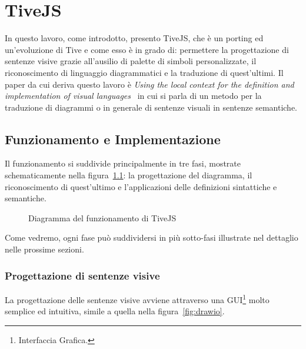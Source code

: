 ﻿\chapter{TiveJS}
    In questo lavoro, come introdotto, presento TiveJS, che è un porting ed un'evoluzione di Tive e come esso è in grado di: permettere la progettazione di sentenze visive grazie all'ausilio di palette di simboli personalizzate, il riconoscimento di linguaggio diagrammatici e la traduzione di quest'ultimi.
    \newline
    Il paper da cui deriva questo lavoro è \textit{Using the local context for the definition and implementation of visual languages}~\cite{localcontext} in cui si parla di un metodo per la traduzione di diagrammi o in generale di sentenze visuali in sentenze semantiche.
    \section{Funzionamento e Implementazione}
        Il funzionamento si suddivide principalmente in tre fasi, mostrate schematicamente nella figura~\ref{fig:funzionamento}: la progettazione del diagramma, il riconoscimento di quest'ultimo e l'applicazioni delle definizioni sintattiche e semantiche.
        \newline
        \begin{figure}
            \centering
            \caption{Diagramma del funzionamento di TiveJS}
            \label{fig:funzionamento}
        \end{figure}
        Come vedremo, ogni fase può suddividersi in più sotto-fasi illustrate nel dettaglio nelle prossime sezioni.
        
        \subsection{Progettazione di sentenze visive}
            La progettazione delle sentenze visive avviene attraverso una GUI\footnote{Interfaccia Grafica.} molto semplice ed intuitiva, simile a quella nella figura~\ref{fig:drawio}.


